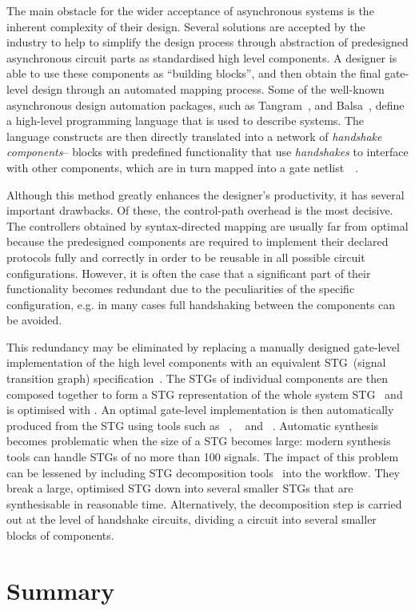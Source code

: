 The main obstacle for the wider acceptance of asynchronous systems is the inherent complexity of their design. Several solutions are
accepted by the industry to help to simplify the design process through abstraction
of predesigned asynchronous circuit parts as standardised high level
components. A designer is able to use these components as ``building
blocks'', and then obtain the final gate-level design through an
automated mapping process. Some of the well-known asynchronous
design automation packages, such as Tangram~\cite{951597}, and Balsa~\cite{balsa},
define a high-level programming language that is used to describe
systems. The language constructs are then directly translated into
a network of \emph{handshake components}-- blocks with predefined
functionality that use \emph{handshakes} to interface with other components,
which are in turn mapped into a gate netlist~~\cite{van2004handshake}.

Although this method greatly enhances the designer's productivity,
it has several important drawbacks. Of these, the control-path overhead
is the most decisive. The controllers obtained by syntax-directed
mapping are usually far from optimal because the predesigned components
are required to implement their declared protocols fully and correctly
in order to be reusable in all possible circuit configurations. However,
it is often the case that a significant part of their functionality
becomes redundant due to the peculiarities of the specific configuration,
e.g. in many cases full handshaking between the components can be
avoided.

This redundancy may be eliminated by replacing a manually designed
gate-level implementation of the high level components with an equivalent
STG~(signal transition graph) specification~\cite{Yakovlev_1998_cs}.
The STGs of individual components are then composed together to form a
 STG representation of the whole system STG~\cite{785214} and is optimised with \cite{cortadella_petrify}.
An optimal gate-level implementation is then automatically produced
from the STG using tools such as ~\cite{cortadella_petrify},
~\cite{Sentovich:M92/41} and ~\cite{Khomenko_2004_MPSAT}.
Automatic synthesis becomes problematic when the size of a STG becomes
large: modern synthesis tools can handle STGs of no more than 100
signals. The impact of this problem can be lessened by including STG decomposition tools~\cite{DesiJ} into the workflow. They break a large, optimised STG down into several smaller STGs that are synthesisable
in reasonable time. Alternatively, the decomposition step is carried
out at the level of handshake circuits, dividing a circuit into several
smaller blocks of components.






\section{Summary}
